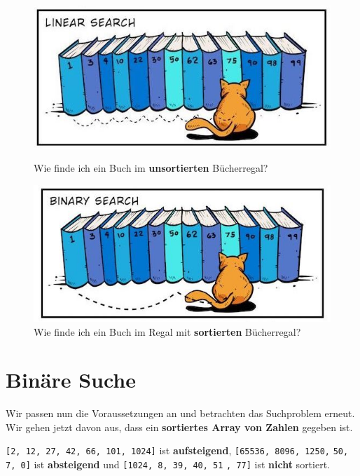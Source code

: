\begin{figure}[htb]
\centering
\begin{minipage}{0.45\textwidth}
\centering
\includegraphics[width=\textwidth]{linear_search}
\caption{Wie finde ich ein Buch im \textbf{unsortierten} Bücherregal?}
\label{figure-linear-search}
\end{minipage}
\hfill
\begin{minipage}{0.45\textwidth}
\centering
\includegraphics[width=\textwidth]{binary_search}
\caption{Wie finde ich ein Buch im Regal mit \textbf{sortierten} Bücherregal?}
\label{figure-binary-search}
\end{minipage}
\end{figure}

\section{Binäre Suche}

Wir passen nun die Voraussetzungen an und betrachten das Suchproblem erneut. Wir gehen jetzt davon aus, dass ein \textbf{sortiertes Array von Zahlen} gegeben ist.

\begin{example}
\lstinline[language=pseudocode]{[2, 12, 27, 42, 66, 101, 1024]} ist \textbf{aufsteigend}, \lstinline[language=pseudocode]{[65536, 8096, 1250,} \lstinline{50, 7, 0]} ist \textbf{absteigend} und \lstinline[language=pseudocode]{[1024, 8, 39, 40, 51} \lstinline{, 77]} ist \textbf{nicht} sortiert.
\end{example}

